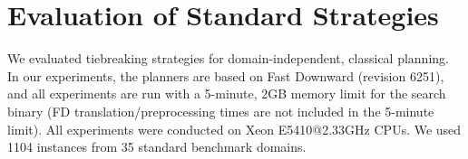 
\section{Evaluation of Standard Strategies}
\label{sec:eval-common-strategies}
We evaluated tiebreaking strategies for domain-independent, classical planning.
In our experiments, the planners are based on Fast Downward (revision 6251), and all
experiments are run with a 5-minute, 2GB memory limit for the search binary (FD translation/preprocessing times are not included in the 5-minute limit).
All experiments were conducted on Xeon E5410@2.33GHz CPUs.
We used 1104 instances from 35 standard benchmark domains.


